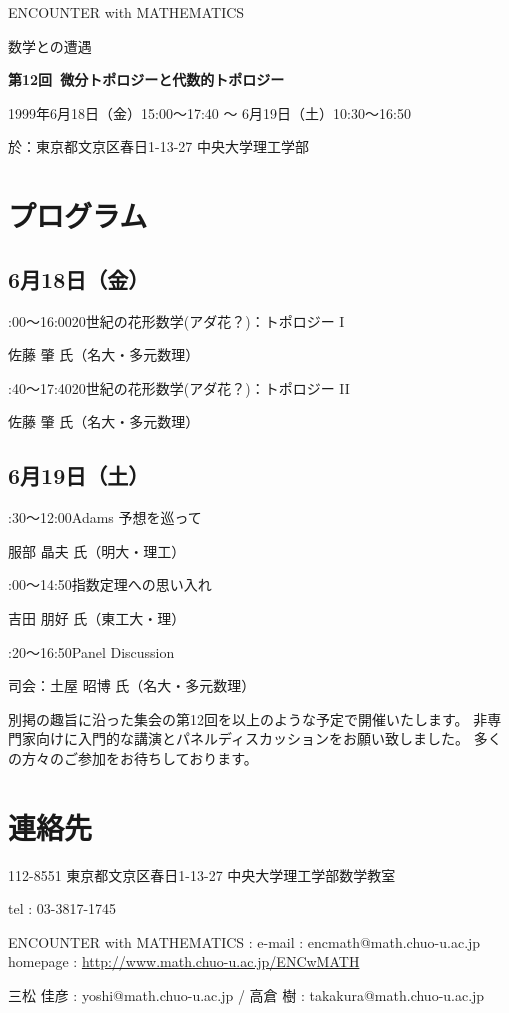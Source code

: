 \documentclass[uplatex,dvipdfmx]{jlreq}
\newcommand{\talk}[3]{%
\noindent
#1\quad #2\par
\hspace*{2em}#3\par\smallskip
}
\newcommand{\EwMnumber}{第12回}
\newcommand{\EwMtitle}{微分トポロジーと代数的トポロジー}
\newcommand{\EwMdate}{1999年6月18日（金）15:00～17:40 ～ 6月19日（土）10:30～16:50}
\newcommand{\EwMplace}{東京都文京区春日1-13-27 中央大学理工学部}
\newcommand{\EwMtitleblock}{

\vspace*{-5mm}

\begin{center}

{\Large ENCOUNTER with MATHEMATICS}

\vspace{2mm}

{\large 数学との遭遇}

\vspace{4mm}

{\Large \bfseries \EwMnumber\ \EwMtitle}

\vspace{4mm}

\EwMdate

\vspace{2mm}

於：\EwMplace

\end{center}

\vspace{2mm}

}
\begin{document}
\EwMtitleblock


\section*{プログラム}

\subsection*{6月18日（金）}

\talk
{15:00～16:00}
{20世紀の花形数学(アダ花？)：トポロジー I}
{佐藤 肇 氏（名大・多元数理）}

\talk
{16:40～17:40}
{20世紀の花形数学(アダ花？)：トポロジー II}
{佐藤 肇 氏（名大・多元数理）}

\subsection*{6月19日（土）}

\talk
{10:30～12:00}
{Adams 予想を巡って}
{服部 晶夫 氏（明大・理工）}

\talk
{14:00～14:50}
{指数定理への思い入れ}
{吉田 朋好 氏（東工大・理）}

\talk
{15:20～16:50}
{Panel Discussion}
{司会：土屋 昭博 氏（名大・多元数理）}


\bigskip

別掲の趣旨に沿った集会の第12回を以上のような予定で開催いたします。  
非専門家向けに入門的な講演とパネルディスカッションをお願い致しました。  
多くの方々のご参加をお待ちしております。


\section*{連絡先}

112-8551 東京都文京区春日1-13-27 中央大学理工学部数学教室 

tel : 03-3817-1745  

ENCOUNTER with MATHEMATICS : e-mail : encmath@math.chuo-u.ac.jp  
homepage : \url{http://www.math.chuo-u.ac.jp/ENCwMATH}  

三松 佳彦 : yoshi@math.chuo-u.ac.jp / 高倉 樹 : takakura@math.chuo-u.ac.jp
\end{document}
